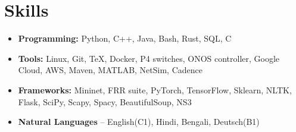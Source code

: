 \section{Skills}

\vspace{1pt}

\begin{itemize}

\item \textbf{Programming:} Python, C++, Java, Bash, Rust, SQL, C

\vspace{1pt}

\item \textbf{Tools:} Linux, Git, TeX, Docker, P4 switches, ONOS controller, Google Cloud, AWS, Maven, MATLAB, NetSim, Cadence
\vspace{1pt}

\item \textbf{Frameworks:} Mininet, FRR suite, PyTorch, TensorFlow, Sklearn, NLTK, Flask, SciPy, Scapy, Spacy, BeautifulSoup, NS3

\item \textbf{Natural Languages} -- English(C1), Hindi, Bengali, Deutsch(B1)

\end{itemize}